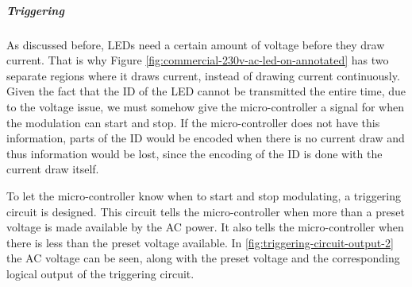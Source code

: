 
\subparagraph{Triggering}

	As discussed before, LEDs need a certain amount of voltage before they draw current.
	That is why Figure \ref{fig:commercial-230v-ac-led-on-annotated} has two separate regions where it draws current, instead of drawing current continuously.
	Given the fact that the ID of the LED cannot be transmitted the entire time, due to the voltage issue, we must somehow give the micro-controller a signal for when the modulation can start and stop.
	If the micro-controller does not have this information, parts of the ID would be encoded when there is no current draw and thus information would be lost, since the encoding of the ID is done with the current draw itself.

	To let the micro-controller know when to start and stop modulating, a triggering circuit is designed.
	This circuit tells the micro-controller when more than a preset voltage is made available by the AC power.
	It also tells the micro-controller when there is less than the preset voltage available.
	In \autoref{fig:triggering-circuit-output-2} the AC voltage can be seen, along with the preset voltage and the corresponding logical output of the triggering circuit.



